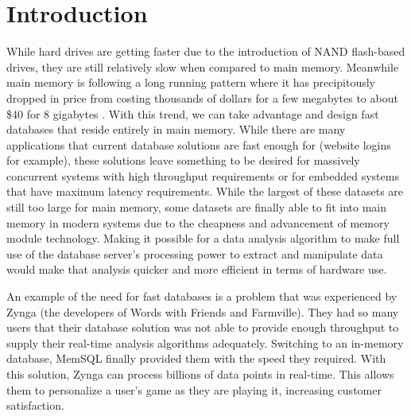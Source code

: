 \documentclass[conference, compsoc]{IEEEtran}
\begin{document}
\section{Introduction}
While hard drives are getting faster due to the introduction of NAND flash-based drives,
they are still relatively slow when compared to main memory. Meanwhile main memory is 
following a long running pattern where it has precipitously dropped in price from costing 
thousands of dollars for a few megabytes to about \$40 for 8 gigabytes \cite{jcmit}. 
With this trend, we can take advantage and design fast databases that reside entirely in main memory. While there are many 
applications that current database solutions are fast enough for (website logins for 
example), these solutions leave something to be desired for massively concurrent 
systems with high throughput requirements or for embedded systems that have maximum latency 
requirements. While the largest of these datasets are still too large for main memory, 
some datasets are finally able to fit into main memory in modern systems due to the 
cheapness and advancement of memory module technology. Making it possible for a data 
analysis algorithm to make full use of the database server's processing power to extract 
and manipulate data would make that analysis quicker and more efficient in terms of hardware use.
\par\vspace{\baselineskip}
An example of the need for fast databases is a problem that was experienced by Zynga 
(the developers of Words with Friends and Farmville). They had so many users that their 
database solution was not able to provide enough throughput to supply their real-time 
analysis algorithms adequately. Switching to an in-memory database, MemSQL finally 
provided them with the speed they required. With this solution, Zynga can process 
billions of data points in real-time. This allows them to personalize a user's game 
as they are playing it, increasing customer satisfaction.
\end{document}

